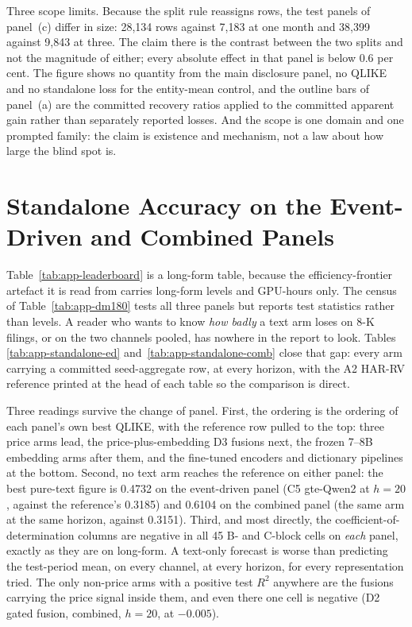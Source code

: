 Three scope limits. Because the split rule reassigns rows, the test panels of
panel~(c) differ in size: 28,134 rows against 7,183 at one month and 38,399
against 9,843 at three. %
The claim there is the contrast between the two
splits and not the magnitude of either; every absolute effect in that
panel is below 0.6 per cent.
The figure shows no quantity from the main disclosure panel, no QLIKE and no
standalone loss for the entity-mean control, and the outline bars of panel~(a)
are the committed recovery ratios applied to the committed apparent gain
rather than separately reported losses. And the scope is one domain and one
prompted family: the claim is existence and mechanism, not a law about how
large the blind spot is.

\clearpage

\FloatBarrier
\section{Standalone Accuracy on the Event-Driven and Combined Panels}
\label{app:res-standalone-other}

Table~\ref{tab:app-leaderboard} is a long-form table, because the
efficiency-frontier artefact it is read from carries long-form levels and
GPU-hours only. The census of Table~\ref{tab:app-dm180} tests all three
panels but reports test statistics rather than levels. A reader who
wants to know \emph{how badly} a text arm loses on 8-K filings, or on the
two channels pooled, has nowhere in the report to look. Tables
\ref{tab:app-standalone-ed} and~\ref{tab:app-standalone-comb} close that
gap: every arm carrying a committed seed-aggregate row, at every horizon,
with the A2 HAR-RV reference printed at the head of each table so the
comparison is direct.

Three readings survive the change of panel. First, the ordering is the
ordering of each panel's own best QLIKE, with the reference row pulled to the
top: three price arms lead, the price-plus-embedding D3
fusions next, the frozen 7--8B embedding arms after them, and the
fine-tuned encoders and dictionary pipelines at the bottom. Second, no text
arm reaches the reference on either panel: the best pure-text figure is
0.4732 on the event-driven panel (C5 gte-Qwen2 at $h{=}20$, against the
reference's 0.3185) and 0.6104 on the combined panel (the same arm at the
same horizon, against 0.3151). Third, and most directly, the
coefficient-of-determination columns are negative in all 45 B- and C-block
cells on \emph{each} panel, exactly as they are on long-form. A text-only
forecast is worse than predicting the test-period mean, on every channel,
at every horizon, for every representation tried. The only non-price arms
with a positive test $R^2$ anywhere are the fusions carrying the price
signal inside them, and even there one cell is negative (D2 gated fusion,
combined, $h{=}20$, at $-0.005$).

